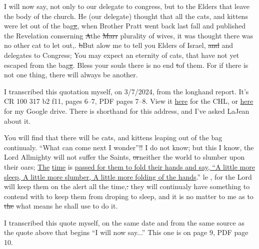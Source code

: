 		\begin{compactdesc} %
			\item[19 June 1853] I will now say, not only to our delegate to congress, but to the Elders that leave the body of the church. He (our delegate) thought that all the cats, and kittens were let out of the bag\sout{g}, when Brother Pratt went back last fall and published the Revelation conserning \sout{A}the \sout{Marr} plurality of wives, it was thought there was no other cat to let out,. \sout{b}But alow me to tell you Elders of Israel, \sout{and} and delegates to Congress; You may expect an eternity of cats, that have not yet escaped from the bag\sout{g}. Bless your souls there is no end \sout{t}of them. For if there is not one thing, there will always be another.
				\begin{compactitem}
					\item I transcribed this quotation myself, on 3/7/2024, from the longhand report. It's CR 100 317 b2 f11, pages 6--7, PDF pages 7--8. View it \href{https://catalog.churchofjesuschrist.org/assets/d01ece03-48fe-4555-b135-6f7e82112133/0/0}{here} for the CHL, or \href{https://drive.google.com/file/d/1r3YMPdAcCJnLoR-ys1udo4_W-AyJIpH0/view?usp=drive_link}{here} for my Google drive. There is shorthand for this address, and I've asked LaJean about it.
				\end{compactitem}
			\item[19 June 1853] You will find that there will be cats, and kittens leaping out of the bag continualy. ``What can come next I wonder''!! I do not know; but this I know, the Lord Allmighty will not suffer the Saints, \sout{or}neither the world to slumber upon their oars; \uline{The} \uline{time} is \uline{passed for them to fold their hands and say, ``A little more sleep, A little more slumber, A little more folding of the hands}.''  le     , for the Lord will keep them on the alert all the time,\sout{.} they will continualy have something to contend with to keep them from droping to sleep, and it is no matter to me as to \sout{the} what means he shall use to do it.
				\begin{compactitem}
					\item I transcribed this quote myself, on the same date and from the same source as the quote above that begins ``I will now say...'' This one is on page 9, PDF page 10.

\end{compactitem}
\end{compactdesc}
